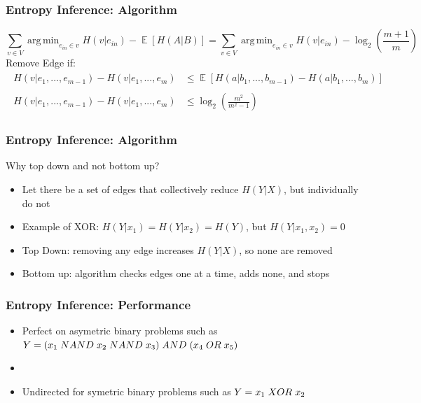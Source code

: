 \documentclass[14pt,aspectratio=169]{beamer}
\DeclareMathOperator*{\argmin}{arg\,min}
\DeclareMathOperator{\EX}{\mathbb{E}}
\begin{document}
\begin{frame}
\frametitle{Entropy Inference: Algorithm}
\small
$$ \sum_{v \in V} \argmin_{e_{in} \in v} H(v|e_{in}) - \EX[H(A|B)]  =  \sum_{v \in V} \argmin_{e_{in} \in v} H(v|e_{in}) - \log_2(\frac{m+1}{m}) $$
Remove Edge if:
\begin{align}
\begin{split}
H(v|e_1,...,e_{m-1}) -  H(v|e_1,...,e_m) &\leq \EX[{H(a|b_1,...,b_{m-1}) -  H(a|b_1,...,b_m)}] \\ \\
H(v|e_1,...,e_{m-1}) -  H(v|e_1,...,e_m)  &\leq \log_2(\frac{m^2}{m^2-1})  
\end{split}
\end{align}
\end{frame}

\begin{frame}
\frametitle{Entropy Inference: Algorithm}
Why top down and not bottom up?
\begin{itemize}
\item Let there be a set of edges that collectively reduce $H(Y|X)$, but individually do not
\item Example of XOR: $H(Y|x_1)=H(Y|x_2)=H(Y)$, but $H(Y|x_1,x_2)=0$
\item Top Down: removing any edge increases $H(Y|X)$, so none are removed
\item Bottom up: algorithm checks edges one at a time, adds none, and stops
\end{itemize}

\end{frame}


\begin{frame}
\frametitle{Entropy Inference: Performance}
\begin{itemize}
\item Perfect on asymetric binary problems such as $Y=(x_1\hspace{.1cm} NAND\hspace{.1cm} x_2\hspace{.1cm} NAND\hspace{.1cm} x_3)\hspace{.1cm} AND\hspace{.1cm} (x_4\hspace{.1cm} OR\hspace{.1cm} x_5)$
\item[]
\item Undirected for symetric binary problems such as $Y=x_1 \hspace{.1cm}XOR \hspace{.1cm}x_2$
\end{itemize}
\end{frame}
\end{document}
